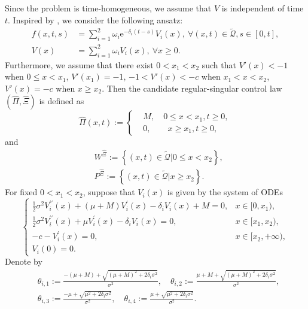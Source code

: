 \documentclass[11pt,reqno]{article}%
\numberwithin{equation}{section}
\begin{document}
Since the problem is time-homogeneous, we assume that $V$ is independent of time $t$. Inspired by \citet{hu2025equilibrium}, we consider the following ansatz:
\begin{equation}\begin{aligned}\label{fv}
	f(x,t,s)&=\sum\limits_{i=1}^{2}\omega_i \mathrm{e}^{-\delta_i (t-s)}V_i(x),\  \forall (x,t)\in\mathcal{\tilde{Q}}, s\in[0,t],\\
	V(x)&=\sum\limits_{i=1}^{2}\omega_i V_i(x),\ \forall x\ge 0.\end{aligned}\end{equation}
Furthermore, we assume that there exist $0 < x_1 < x_2$ such that $V'(x) < -1$ when $0\le x < x_1$, $V'(x_1)=-1$, $-1 < V'(x) < -c$ when $x_1 < x < x_2$, $V'(x) =-c$ when $x\ge x_2$. Then the candidate regular-singular control law $\left(\hat\Pi,\hat\Xi\right)$ is defined as 
\begin{equation}\label{hatpi}
\hat \Pi(x,t) := \left\{\begin{aligned}
& M,\quad  0 \le x < x_1, t\ge0,\\
& 0, \qquad x \geq x_1, t\ge 0,
\end{aligned}\right.
\end{equation}
and
\begin{equation}
\begin{aligned}
&W^{\hat{\Xi}}:=\left\{(x,t)\in\mathcal{\tilde{Q}}|0\leq x< x_2\right\},\\
&P^{\hat{\Xi}}:=\left\{(x,t)\in\mathcal{\tilde{Q}}|x\ge x_2\right\}.
\end{aligned}\label{hatxi}
\end{equation}
For fixed $0 < x_1 < x_2$, suppose that $V_i(x)$ is given by the system of ODEs
\begin{equation}\label{eq:Vi_ODE}
\begin{cases}
\frac{1}{2} \sigma^2 V^{\prime\prime}_i(x) + (\mu + M) V^\prime_i(x) - \delta_i V_i(x) +M = 0, & x \in [0, x_1),\\
\frac{1}{2} \sigma^2 V^{\prime\prime}_i(x) + \mu V^\prime_i(x) - \delta_i V_i(x) = 0, \qquad & x \in [x_1, x_2),\\
-c- V^\prime_i(x) = 0, & x \in [x_2, +\infty),\\
V_i(0)=0.
\end{cases}
\end{equation}
Denote by
\begin{equation}\begin{aligned}\nonumber
&\theta_{i,1}:= \frac{-(\mu+M) + \sqrt{(\mu+M)^2 + 2 \delta_i \sigma^2}}{\sigma^2} ,\quad \theta_{i,2}:= \frac{\mu+M + \sqrt{(\mu+M)^2 + 2 \delta_i \sigma^2}}{\sigma^2},\\
&\theta_{i,3}:= \frac{-\mu + \sqrt{\mu^2 + 2 \delta_i \sigma^2}}{\sigma^2} ,\quad\theta_{i,4}:= \frac{\mu + \sqrt{\mu^2 + 2 \delta_i \sigma^2}}{\sigma^2}.\end{aligned}\end{equation}
\end{document}
